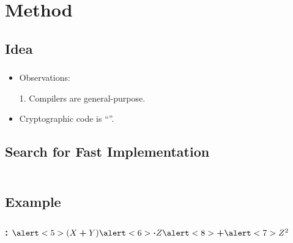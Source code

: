 \documentclass[dvipsnames,table,aspectratio=169]{beamer}
\begin{document}
\section{Method}
\subsection{Idea}
\begin{frame}
    \centering
    \frametitle{\insertsubsection}
    \begin{itemize}
        \item Observations:
        \item[1.] Compilers are general-purpose.
        \item<2->[2.] Cryptographic code is ``''.
    \end{itemize}

\end{frame}

\subsection{Search for Fast Implementation}
\begin{frame}[t]{}
    \centering
    \frametitle{\insertsubsection}
    \begin{columns}
        \centering
        

    \end{columns}
\end{frame}

\newcommand{\cnothing}{c_{\scaleto{\varnothing}{4pt}}}
\newcommand{\ali}[2]{\makebox[#1][r]{#2}}
\subsection{Example}
\begin{frame}[t]{}
    \frametitle{\insertsubsection: $\alert<5>{(X \boldsymbol{+} Y)} \alert<6>{\boldsymbol{\cdot} Z} \alert<8>{\boldsymbol{+}} \alert<7>{Z^2}$}
    \centering

    \vspace{-1em}
    
\end{frame}
\end{document}
